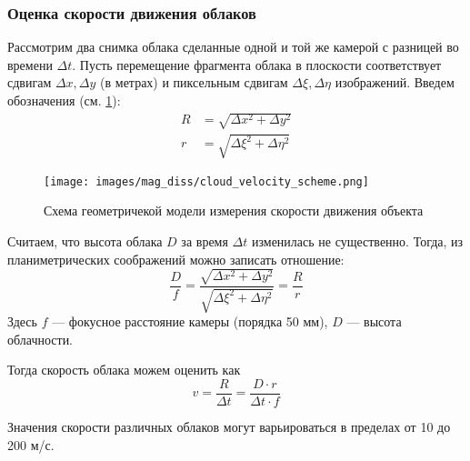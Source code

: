 %
%

\subsubsection{Оценка скорости движения облаков}
Рассмотрим два снимка облака сделанные одной и той же камерой с разницей во
времени $\Delta t$. Пусть перемещение фрагмента облака в плоскости соответствует
сдвигам $\Delta x, \Delta y$ (в метрах) и пиксельным сдвигам
$\Delta \xi, \Delta \eta$ изображений. Введем обозначения (см. \ref{img:cloud_velocity_scheme}):
\begin{align*}
  R &= \sqrt{\Delta x^2 + \Delta y^2}\\
  r &= \sqrt{\Delta \xi^2 + \Delta \eta^2}
\end{align*}

\begin{figure}[H]
\centering
\texttt{[image: images/mag\_diss/cloud\_velocity\_scheme.png]}
\caption{Схема геометричекой модели измерения скорости движения объекта}
\label{img:cloud_velocity_scheme}
\end{figure}

Считаем, что высота облака $D$ за время $\Delta t$ изменилась не существенно.
Тогда, из планиметрических соображений можно записать отношение:
\begin{equation}
  \frac{D}{f} = \frac{
    \sqrt{\Delta x^2 + \Delta y^2}
  }{
    \sqrt{\Delta \xi^2 + \Delta \eta^2}
  } = \frac{R}{r}
\end{equation}
Здесь $f$ --- фокусное расстояние камеры (порядка 50 мм), $D$ --- высота
облачности.

Тогда скорость облака можем оценить как
\begin{equation}
  v = \frac{R}{\Delta t} =  \frac{D \cdot r}{\Delta t \cdot f}
\end{equation}

Значения скорости различных облаков могут варьироваться в пределах от 10 до
200 м/с.